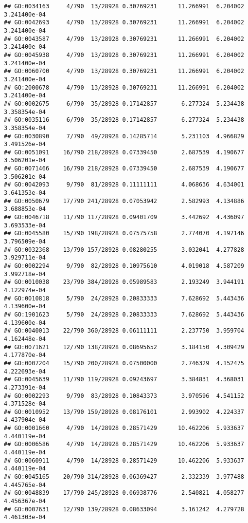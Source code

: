 \documentclass[
]{article}
\begin{document}
\begin{verbatim}
## GO:0034163     4/790  13/28928 0.30769231      11.266991  6.204002 3.241400e-04
## GO:0042693     4/790  13/28928 0.30769231      11.266991  6.204002 3.241400e-04
## GO:0043587     4/790  13/28928 0.30769231      11.266991  6.204002 3.241400e-04
## GO:0045938     4/790  13/28928 0.30769231      11.266991  6.204002 3.241400e-04
## GO:0060700     4/790  13/28928 0.30769231      11.266991  6.204002 3.241400e-04
## GO:2000678     4/790  13/28928 0.30769231      11.266991  6.204002 3.241400e-04
## GO:0002675     6/790  35/28928 0.17142857       6.277324  5.234438 3.358354e-04
## GO:0035116     6/790  35/28928 0.17142857       6.277324  5.234438 3.358354e-04
## GO:0030890     7/790  49/28928 0.14285714       5.231103  4.966829 3.491526e-04
## GO:0051091    16/790 218/28928 0.07339450       2.687539  4.190677 3.506201e-04
## GO:0071466    16/790 218/28928 0.07339450       2.687539  4.190677 3.506201e-04
## GO:0042093     9/790  81/28928 0.11111111       4.068636  4.634001 3.641353e-04
## GO:0050679    17/790 241/28928 0.07053942       2.582993  4.134886 3.688853e-04
## GO:0046718    11/790 117/28928 0.09401709       3.442692  4.436097 3.693533e-04
## GO:0045580    15/790 198/28928 0.07575758       2.774070  4.197146 3.796509e-04
## GO:0032368    13/790 157/28928 0.08280255       3.032041  4.277828 3.929711e-04
## GO:0002294     9/790  82/28928 0.10975610       4.019018  4.587209 3.992718e-04
## GO:0010038    23/790 384/28928 0.05989583       2.193249  3.944191 4.122974e-04
## GO:0010818     5/790  24/28928 0.20833333       7.628692  5.443436 4.139600e-04
## GO:1901623     5/790  24/28928 0.20833333       7.628692  5.443436 4.139600e-04
## GO:0040013    22/790 360/28928 0.06111111       2.237750  3.959704 4.162448e-04
## GO:0071621    12/790 138/28928 0.08695652       3.184150  4.309429 4.177870e-04
## GO:0007204    15/790 200/28928 0.07500000       2.746329  4.152475 4.222693e-04
## GO:0045639    11/790 119/28928 0.09243697       3.384831  4.368031 4.273391e-04
## GO:0002293     9/790  83/28928 0.10843373       3.970596  4.541152 4.371528e-04
## GO:0010952    13/790 159/28928 0.08176101       2.993902  4.224337 4.437904e-04
## GO:0001660     4/790  14/28928 0.28571429      10.462206  5.933637 4.440119e-04
## GO:0006586     4/790  14/28928 0.28571429      10.462206  5.933637 4.440119e-04
## GO:0060911     4/790  14/28928 0.28571429      10.462206  5.933637 4.440119e-04
## GO:0045165    20/790 314/28928 0.06369427       2.332339  3.977488 4.445765e-04
## GO:0048839    17/790 245/28928 0.06938776       2.540821  4.058277 4.456367e-04
## GO:0007631    12/790 139/28928 0.08633094       3.161242  4.279728 4.461303e-04

\end{verbatim}
\end{document}
